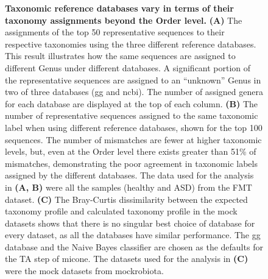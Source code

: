   \begin{figure}[H]
    \centering
    \caption{
      \textbf{Taxonomic reference databases vary in terms of their taxonomy assignments beyond the Order level.}
      \textbf{(A)} The assignments of the top 50 representative sequences to their respective taxonomies using the three different reference databases.
      This result illustrates how the same sequences are assigned to different Genus under different databases.
      A significant portion of the representative sequences are assigned to an ``unknown'' Genus in two of three databases (\ac{gg} and \ac{ncbi}).
      The number of assigned genera for each database are displayed at the top of each column.
      \textbf{(B)} The number of representative sequences assigned to the same taxonomic label when using different reference databases, shown for the top 100 sequences.
      The number of mismatches are fewer at higher taxonomic levels, but, even at the Order level there exists greater than 51\% of mismatches, demonstrating the poor agreement in taxonomic labels assigned by the different databases.
      The data used for the analysis in \textbf{(A, B)} were all the samples (healthy and ASD) from the FMT dataset.
      \textbf{(C)} The Bray-Curtis dissimilarity between the expected taxonomy profile and calculated taxonomy profile in the mock datasets shows that there is no singular best choice of database for every dataset, as all the databases have similar performance.
      The \ac{gg} database and the Naive Bayes classifier are chosen as the defaults for the TA step of \ac{micone}.
      The datasets used for the analysis in \textbf{(C)} were the mock datasets from mockrobiota.
    }
    \label{fig:figure3}
  \end{figure}


